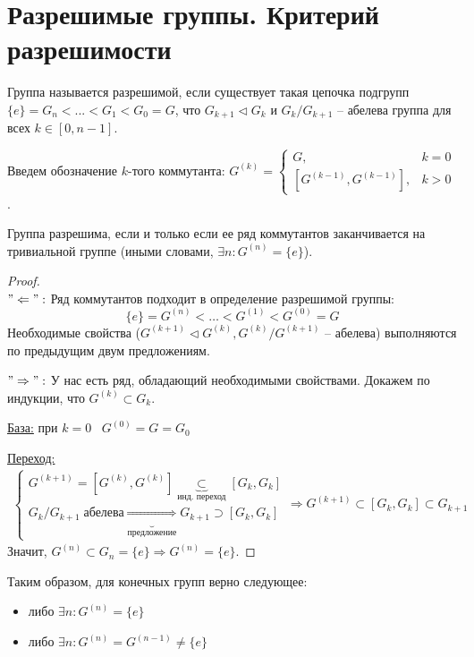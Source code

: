 \section{Разрешимые группы. Критерий разрешимости}
\begin{conj}
    Группа называется разрешимой, если существует такая цепочка подгрупп \\ $\{e\} = G_n < ... < G_1 < G_0 = G$, что $G_{k + 1} \lhd G_k$ и $G_k / G_{k + 1}$ -- абелева группа для всех $k \in [0, n - 1]$.
\end{conj}
Введем обозначение $k$-того коммутанта: 
$G^{(k)} = \begin{cases}
    G, & k = 0 \\
    [G^{(k - 1)}, G^{(k - 1)}], & k > 0
 \end{cases}$.
 
\begin{theorem}
    Группа разрешима, если и только если ее ряд коммутантов заканчивается на тривиальной группе (иными словами, $\exists n : G^{(n)} = \{e\}$).
\end{theorem}
\begin{proof} \quad \\
     $"\Leftarrow":$ Ряд коммутантов подходит в определение разрешимой группы:
     \[ \{e\} = G^{(n)} < \dots < G^{(1)} < G^{(0)} = G \]
     Необходимые свойства ($G^{(k + 1)} \lhd G^{(k)}, G^{(k)} / G^{(k + 1)}$ -- абелева) выполняются по предыдущим двум предложениям.
    
     $"\Rightarrow":$ У нас есть ряд, обладающий необходимыми свойствами.
     Докажем по индукции, что $G^{(k)} \subset G_k$.

     \quad \underline{База:} при $k = 0 \;\;\; G^{(0)} = G = G_0$

     \quad \underline{Переход:}
     \begin{gather*}
        \begin{cases}
            G^{(k + 1)} = [G^{(k)}, G^{(k)}] \underbrace{\subset}_{\text{инд. переход}} [G_k, G_k] \\
            G_k / G_{k + 1} \; \text{абелева} \underbrace{\Rightarrow}_{\text{предложение}} G_{k + 1} \supset [G_k, G_k]
           \end{cases} \Rightarrow G^{(k + 1)} \subset [G_k, G_k] \subset G_{k + 1}
     \end{gather*}
    Значит, $G^{(n)} \subset G_n = \{e\} \Rightarrow G^{(n)} = \{e\}$.
\end{proof}
Таким образом, для конечных групп верно следующее:
\begin{itemize}
    \item либо $\exists n : G^{(n)} = \{e\}$
    \item либо $\exists n : G^{(n)} = G^{(n - 1)} \neq \{e\}$
\end{itemize}

